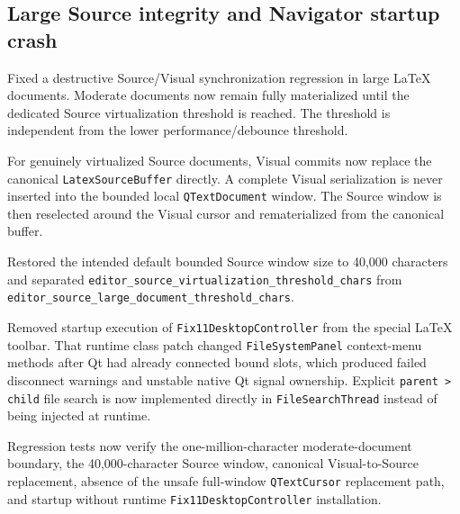 \documentclass[a4paper]{article}
\title{}
\date{}
\author{Mohammad Rahmani}
\begin{document}
   \maketitle

   \begin{preview}
      \section*{Large Source integrity and Navigator startup crash}

      Fixed a destructive Source/Visual synchronization regression in large LaTeX documents.
      Moderate documents now remain fully materialized until the dedicated Source virtualization
      threshold is reached. The threshold is independent from the lower performance/debounce
      threshold.

      For genuinely virtualized Source documents, Visual commits now replace the canonical
      \texttt{LatexSourceBuffer} directly. A complete Visual serialization is never inserted into
      the bounded local \texttt{QTextDocument} window. The Source window is then reselected around
      the Visual cursor and rematerialized from the canonical buffer.

      Restored the intended default bounded Source window size to 40,000 characters and separated
      \texttt{editor\_source\_virtualization\_threshold\_chars} from
      \texttt{editor\_source\_large\_document\_threshold\_chars}.

      Removed startup execution of \texttt{Fix11DesktopController} from the special LaTeX toolbar.
      That runtime class patch changed \texttt{FileSystemPanel} context-menu methods after Qt had
      already connected bound slots, which produced failed disconnect warnings and unstable native
      Qt signal ownership. Explicit \texttt{parent > child} file search is now implemented directly
      in \texttt{FileSearchThread} instead of being injected at runtime.

      Regression tests now verify the one-million-character moderate-document boundary, the
      40,000-character Source window, canonical Visual-to-Source replacement, absence of the
      unsafe full-window \texttt{QTextCursor} replacement path, and startup without runtime
      \texttt{Fix11DesktopController} installation.
   \end{preview}

   
   
\end{document}
